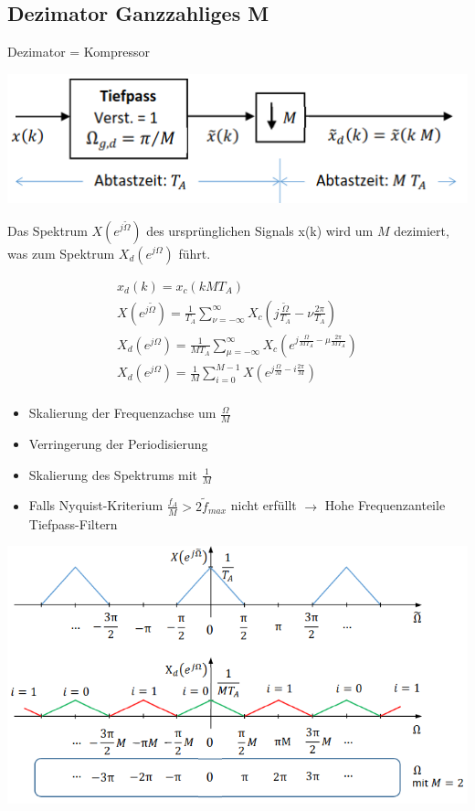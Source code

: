 \documentclass[10pt,a4paper]{article}
\begin{document}
\subsection{Dezimator Ganzzahliges M}
Dezimator = Kompressor 
  \begin{center}
      \includegraphics[width=.35\textwidth]{./img/dezi.png}
  \end{center}
Das Spektrum $X(e^{j\tilde{\Omega}})$ des ursprünglichen Signals x(k) wird um $M$ dezimiert,
was zum Spektrum $X_d(e^{j\Omega})$ führt.
  \begin{mdframed}[style=exercise]
    \begin{align}
        x_d(k)=x_c(kMT_A)\\
        X(e^{j\tilde{\Omega}})=\frac{1}{T_A}\sum_{\nu=-\infty}^{\infty} X_c(j\frac{\tilde{\Omega}}{T_A} -\nu\frac{2\pi}{T_A})\\
        X_d(e^{j\Omega})=\frac{1}{MT_A}\sum_{\mu=-\infty}^{\infty} X_c(e^{j\frac{\Omega}{MT_A} -\mu\frac{2\pi}{MT_A}})\\
        X_d(e^{j\Omega})=\frac{1}{M}\sum_{i=0}^{M-1} X(e^{j\frac{\Omega}{M} -i\frac{2\pi}{M}})\\
    \end{align}
  \end{mdframed}
  \begin{itemize}
    \item Skalierung der Frequenzachse um $\frac{\Omega}{M}$
    \item Verringerung der Periodisierung
    \item Skalierung des Spektrums mit $\frac{1}{M}$
    \item Falls Nyquist-Kriterium $\frac{f_A}{M}>2\tilde{f}_{max}$ nicht erfüllt $\rightarrow$ Hohe Frequenzanteile Tiefpass-Filtern 
  \end{itemize}
  \begin{center}
      \includegraphics[width=.35\textwidth]{./img/dezi2.png}
  \end{center}
\end{document}
